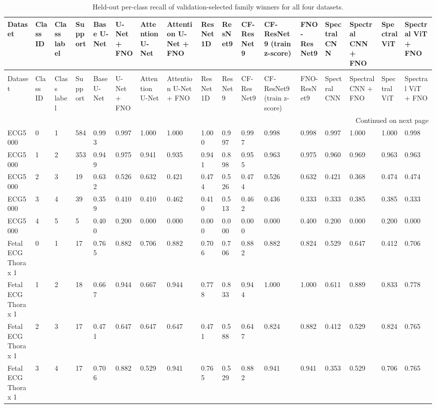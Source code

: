 \begin{longtable}{lllllllllllllllll}
\caption{Held-out per-class recall of validation-selected family winners for all four datasets.} \label{tab:per_class_recall_all_datasets} \\
\toprule
Dataset & Class ID & Class label & Support & Base U-Net & U-Net + FNO & Attention U-Net & Attention U-Net + FNO & ResNet1D & ResNet9 & CF-ResNet9 & CF-ResNet9 (train z-score) & FNO-ResNet9 & Spectral CNN & Spectral CNN + FNO & Spectral ViT & Spectral ViT + FNO \\
\midrule
\endfirsthead
\caption[]{Held-out per-class recall of validation-selected family winners for all four datasets.} \\
\toprule
Dataset & Class ID & Class label & Support & Base U-Net & U-Net + FNO & Attention U-Net & Attention U-Net + FNO & ResNet1D & ResNet9 & CF-ResNet9 & CF-ResNet9 (train z-score) & FNO-ResNet9 & Spectral CNN & Spectral CNN + FNO & Spectral ViT & Spectral ViT + FNO \\
\midrule
\endhead
\midrule
\multicolumn{17}{r}{Continued on next page} \\
\midrule
\endfoot
\bottomrule
\endlastfoot
ECG5000 & 0 & 1 & 584 & 0.993 & 0.997 & 1.000 & 1.000 & 1.000 & 0.997 & 0.997 & 0.998 & 0.998 & 0.997 & 1.000 & 1.000 & 0.998 \\
ECG5000 & 1 & 2 & 353 & 0.949 & 0.975 & 0.941 & 0.935 & 0.941 & 0.898 & 0.955 & 0.963 & 0.975 & 0.960 & 0.969 & 0.963 & 0.963 \\
ECG5000 & 2 & 3 & 19 & 0.632 & 0.526 & 0.632 & 0.421 & 0.474 & 0.526 & 0.474 & 0.526 & 0.632 & 0.421 & 0.368 & 0.474 & 0.474 \\
ECG5000 & 3 & 4 & 39 & 0.359 & 0.410 & 0.410 & 0.462 & 0.410 & 0.513 & 0.462 & 0.436 & 0.333 & 0.333 & 0.385 & 0.385 & 0.333 \\
ECG5000 & 4 & 5 & 5 & 0.400 & 0.200 & 0.000 & 0.000 & 0.000 & 0.000 & 0.000 & 0.000 & 0.400 & 0.200 & 0.000 & 0.200 & 0.000 \\
Fetal ECG Thorax 1 & 0 & 1 & 17 & 0.765 & 0.882 & 0.706 & 0.882 & 0.706 & 0.706 & 0.882 & 0.882 & 0.824 & 0.529 & 0.647 & 0.412 & 0.706 \\
Fetal ECG Thorax 1 & 1 & 2 & 18 & 0.667 & 0.944 & 0.667 & 0.944 & 0.778 & 0.833 & 0.944 & 1.000 & 1.000 & 0.611 & 0.889 & 0.833 & 0.778 \\
Fetal ECG Thorax 1 & 2 & 3 & 17 & 0.471 & 0.647 & 0.647 & 0.647 & 0.471 & 0.588 & 0.647 & 0.824 & 0.882 & 0.412 & 0.529 & 0.824 & 0.765 \\
Fetal ECG Thorax 1 & 3 & 4 & 17 & 0.706 & 0.882 & 0.529 & 0.941 & 0.765 & 0.529 & 0.882 & 0.941 & 0.941 & 0.353 & 0.529 & 0.706 & 0.765 \\

\end{longtable}
